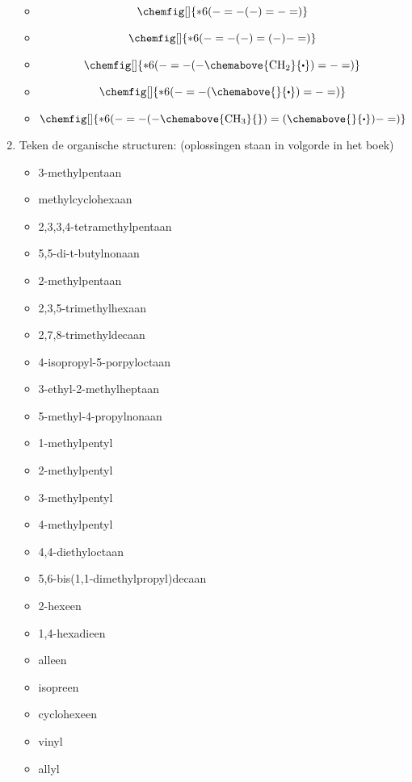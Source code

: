 \documentclass[a4paper,12pt]{article}
\begin{document}
\begin{enumerate}
\begin{itemize}
                \item $$\chemfig[]{*6(-=-(-)=-=)}$$
                \item $$\chemfig[]{*6(-=-(-)=(-)-=)}$$
                \item $$\chemfig[]{*6(-=-(-\chemabove{\ce{CH2}}{\bigcdot{}})=-=)}$$
                \item $$\chemfig[]{*6(-=-(\chemabove{}{\bigcdot{}})=-=)}$$
                \item $$\chemfig[]{*6(-=-(-\chemabove{\ce{CH3}}{})=(\chemabove{}{\bigcdot{}})-=)}$$
            \end{itemize}
        \item Teken de organische structuren: (oplossingen staan in volgorde in het boek)
            \begin{itemize}
                \item 3-methylpentaan
                \item methylcyclohexaan
                \item 2,3,3,4-tetramethylpentaan
                \item 5,5-di-t-butylnonaan
                \item 2-methylpentaan
                \item 2,3,5-trimethylhexaan
                \item 2,7,8-trimethyldecaan
                \item 4-isopropyl-5-porpyloctaan
                \item 3-ethyl-2-methylheptaan
                \item 5-methyl-4-propylnonaan
                \item 1-methylpentyl
                \item 2-methylpentyl
                \item 3-methylpentyl
                \item 4-methylpentyl
                \item 4,4-diethyloctaan
                \item 5,6-bis(1,1-dimethylpropyl)decaan
                \item 2-hexeen
                \item 1,4-hexadieen
                \item alleen 
                \item isopreen
                \item cyclohexeen
                \item vinyl
                \item allyl

\end{itemize}
\end{enumerate}
\end{document}
